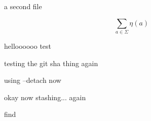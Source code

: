 \documentclass{article}
\begin{document}
a second file

\[
    \sum_{a\in\Sigma} \eta(a)
\]

helloooooo test

testing the git sha thing again

using --detach now

okay now stashing... again

find
\end{document}
